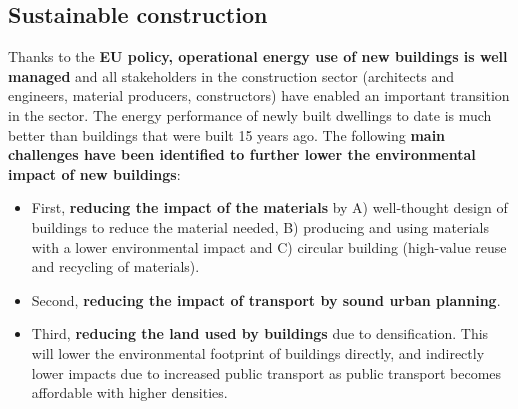 \documentclass[../summary.tex]{subfiles}
\begin{document}
	\subsection{Sustainable construction}
	
	Thanks to the \textbf{EU policy, operational energy use of new buildings is well managed} and all stakeholders in the construction sector (architects and engineers, material producers, constructors) have enabled an important transition in the sector. The energy performance of newly built dwellings to date is much better than buildings that were built 15 years ago. The following \textbf{main challenges have been identified to further lower the environmental impact of new buildings}:
	\begin{itemize}
		\item First, \textbf{reducing the impact of the materials} by A) well-thought design of buildings to reduce the material needed, B) producing and using materials with a lower environmental impact and C) circular building (high-value reuse and recycling of materials).
		\item Second, \textbf{reducing the impact of transport by sound urban planning}.
		\item Third, \textbf{reducing the land used by buildings} due to densification. This will lower the environmental footprint of buildings directly, and indirectly lower impacts due to increased public transport as public transport becomes affordable with higher densities.
	\end{itemize}
	
\end{document}
